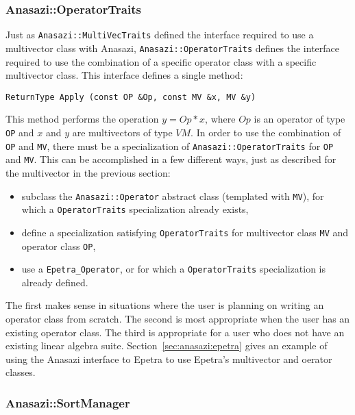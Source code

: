 \subsubsection{Anasazi::OperatorTraits}
\label{sec:anasazi:opt}

Just as \verb!Anasazi::MultiVecTraits! defined the interface required to use a
multivector class with Anasazi, \verb!Anasazi::OperatorTraits! defines the
interface required to use the combination of a specific operator class with a
specific multivector class. This interface defines a single method:
\begin{verbatim}
ReturnType Apply (const OP &Op, const MV &x, MV &y)
\end{verbatim}
This method performs the operation $y = Op*x$, where $Op$ is an operator of type
\verb!OP! and $x$ and $y$ are multivectors of type $VM$. In order to use the
combination of \verb!OP! and \verb!MV!, there must be a specialization of
\verb!Anasazi::OperatorTraits! for \verb!OP! and \verb!MV!. This can be
accomplished in a few different ways, just as described for the multivector in
the previous section:
\begin{itemize}
\item subclass the \verb!Anasazi::Operator! abstract class (templated with
\verb!MV!), for which a \verb!OperatorTraits! specialization already exists,
\item define a specialization satisfying \verb!OperatorTraits! for multivector
class \verb!MV! and operator class \verb!OP!,
\item use a \verb!Epetra_Operator!, or
for which a \verb!OperatorTraits! specialization is already defined.
\end{itemize}

The first makes sense in situations where the user is planning on writing an
operator class from scratch. The second is most appropriate when the user has an
existing operator class. The third is appropriate for a user who does not have
an existing linear algebra suite. Section~\ref{sec:anasazi:epetra} gives an
example of using the Anasazi interface to Epetra to use Epetra's multivector and
oerator classes.

\subsubsection{Anasazi::SortManager}
\label{sec:anasazi:sm}

